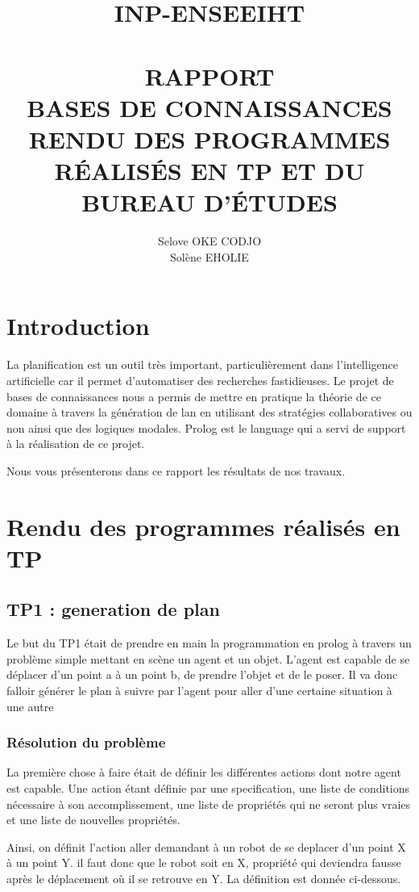 \documentclass[a4paper,10pt]{article}
\title{	\normalsize \textsc{INP-ENSEEIHT} 	%
		 	\\[1.0cm]													%
			\HRule{0.5pt} \\										%
			\LARGE \textbf{\uppercase{Rapport \\ Bases de Connaissances \\ Rendu des programmes r\'{e}alis\'{e}s en TP et du bureau d'\'{e}tudes}}	%
			\HRule{2pt} \\ [0.5cm]								%
		}
\author{Selove OKE CODJO \\ Sol\`{e}ne EHOLIE}
\begin{document}
 \maketitle
 \tableofcontents
 \newpage
 \section{Introduction}
 La planification est un outil tr\`{e}s important, particuli\`{e}rement dans l'intelligence artificielle car il permet d'automatiser des recherches
 fastidieuses. Le projet de bases de connaissances nous a permis de mettre en pratique la th\'{e}orie de ce domaine \`{a} travers la g\'{e}n\'{e}ration de
 lan en utilisant des strat\'{e}gies collaboratives ou non ainsi que des logiques modales. Prolog est le language qui a servi de support \`{a} la r\'{e}alisation
 de ce projet.
 
 Nous vous pr\'{e}senterons dans ce rapport les r\'{e}sultats de nos travaux.
 
 \section{Rendu des programmes r\'{e}alis\'{e}s en TP}
 
  \subsection{TP1 : generation de plan}
  
  Le but du TP1 était de prendre en main la programmation en prolog \`{a} travers un problème simple mettant en scène un agent et un objet. L'agent
  est capable de se d\'{e}placer d'un point a \`{a} un point b, de prendre l'objet et de le poser. Il va donc falloir g\'{e}n\'{e}rer le plan \`{a}
  suivre par l'agent pour aller d'une certaine situation \`{a} une autre
  
  
   \subsubsection{R\'{e}solution du probl\`{e}me}
  La premi\`{e}re chose \`{a} faire \'{e}tait de d\'{e}finir les diff\'{e}rentes actions dont notre agent est capable.
  Une action \'{e}tant d\'{e}finie par une specification, une liste de conditions n\'{e}cessaire \`{a} son accomplissement, une liste de propri\'{e}t\'{e}s qui ne seront
  plus vraies et une liste de nouvelles propri\'{e}t\'{e}s.
  
  Ainsi, on d\'{e}finit l'action aller demandant \`{a} un robot de se deplacer d'un point X \`{a} un point Y. il faut donc que le robot soit en X,
  propri\'{e}t\'{e} qui deviendra fausse apr\`{e}s le déplacement o\`{u} il se retrouve en Y. La d\'{e}finition est donn\'{e}e ci-dessous.
  
\end{document}

